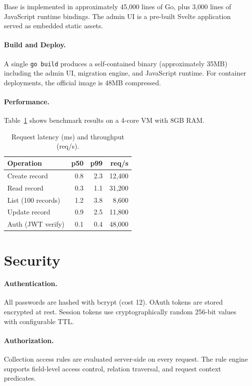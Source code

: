 \documentclass[11pt,twocolumn]{article}
\begin{document}
Base is implemented in approximately 45,000 lines of Go, plus 3,000 lines of JavaScript runtime bindings. The admin UI is a pre-built Svelte application served as embedded static assets.

\paragraph{Build and Deploy.} A single \texttt{go build} produces a self-contained binary (approximately 35MB) including the admin UI, migration engine, and JavaScript runtime. For container deployments, the official image is 48MB compressed.

\paragraph{Performance.} Table~\ref{tab:perf} shows benchmark results on a 4-core VM with 8GB RAM.

\begin{table}[h]
\centering
\caption{Request latency (ms) and throughput (req/s).}
\label{tab:perf}
\begin{tabular}{lrrr}
\toprule
\textbf{Operation} & \textbf{p50} & \textbf{p99} & \textbf{req/s} \\
\midrule
Create record & 0.8 & 2.3 & 12,400 \\
Read record & 0.3 & 1.1 & 31,200 \\
List (100 records) & 1.2 & 3.8 & 8,600 \\
Update record & 0.9 & 2.5 & 11,800 \\
Auth (JWT verify) & 0.1 & 0.4 & 48,000 \\
\bottomrule
\end{tabular}
\end{table}

\section{Security}

\paragraph{Authentication.} All passwords are hashed with bcrypt (cost 12). OAuth tokens are stored encrypted at rest. Session tokens use cryptographically random 256-bit values with configurable TTL.

\paragraph{Authorization.} Collection access rules are evaluated server-side on every request. The rule engine supports field-level access control, relation traversal, and request context predicates.
\end{document}
